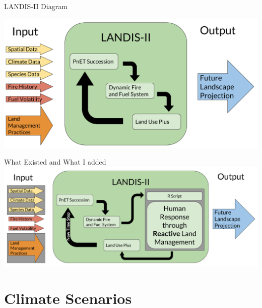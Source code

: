 \documentclass[xcolor=dvipsnames]{beamer}
\begin{document}
\begin{frame}{LANDIS-II Diagram}

\centering\includegraphics[width=\linewidth]{landis_complicated.png}

\end{frame}




\begin{frame}{What Existed and What I added}
\centering\includegraphics[width=\linewidth]{landis_what_i_did_final.png}
\end{frame}

\section{Climate Scenarios}
\subsection{}
\end{document}
